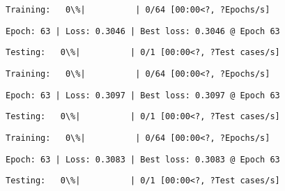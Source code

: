 \documentclass[11pt]{article}
\begin{document}
    
    
    \begin{Verbatim}[commandchars=\\\{\}]
Training:   0\%|          | 0/64 [00:00<?, ?Epochs/s]
    \end{Verbatim}

    
    \begin{Verbatim}[commandchars=\\\{\}]
Epoch: 63 | Loss: 0.3046 | Best loss: 0.3046 @ Epoch 63
    \end{Verbatim}

    
    \begin{Verbatim}[commandchars=\\\{\}]
Testing:   0\%|          | 0/1 [00:00<?, ?Test cases/s]
    \end{Verbatim}

    
    
    \begin{Verbatim}[commandchars=\\\{\}]
Training:   0\%|          | 0/64 [00:00<?, ?Epochs/s]
    \end{Verbatim}

    
    \begin{Verbatim}[commandchars=\\\{\}]
Epoch: 63 | Loss: 0.3097 | Best loss: 0.3097 @ Epoch 63
    \end{Verbatim}

    
    \begin{Verbatim}[commandchars=\\\{\}]
Testing:   0\%|          | 0/1 [00:00<?, ?Test cases/s]
    \end{Verbatim}

    
    
    \begin{Verbatim}[commandchars=\\\{\}]
Training:   0\%|          | 0/64 [00:00<?, ?Epochs/s]
    \end{Verbatim}

    
    \begin{Verbatim}[commandchars=\\\{\}]
Epoch: 63 | Loss: 0.3083 | Best loss: 0.3083 @ Epoch 63
    \end{Verbatim}

    
    \begin{Verbatim}[commandchars=\\\{\}]
Testing:   0\%|          | 0/1 [00:00<?, ?Test cases/s]
    \end{Verbatim}
\end{document}
